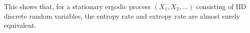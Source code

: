 \documentclass[pdflatex]{sn-jnl}%
\theoremstyle{thmstyleone}
\newtheorem{example}{Example}
\newtheorem*{solution}{Solution}
\theoremstyle{thmstyletwo}%
\theoremstyle{thmstylethree}%
\begin{document}
This shows that, for a stationary ergodic process \( (X_1, X_2, \ldots) \) consisting of IID discrete random variables, the entropy rate and extropy rate are almost surely equivalent.











\end{document}

